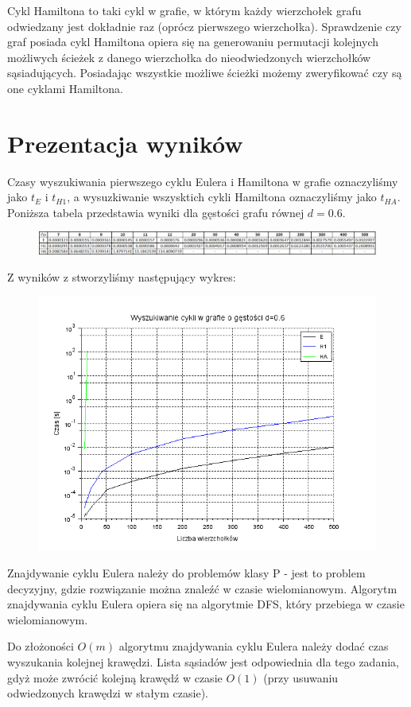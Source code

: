 \documentclass{article}
\begin{document}
Cykl Hamiltona to taki cykl w grafie, w którym każdy wierzchołek grafu odwiedzany jest dokładnie raz (oprócz pierwszego wierzchołka). Sprawdzenie czy graf posiada cykl Hamiltona opiera się na generowaniu permutacji kolejnych możliwych ścieżek z danego wierzchołka do nieodwiedzonych wierzchołków sąsiadujących. Posiadając wszystkie możliwe ścieżki możemy zweryfikować czy są one cyklami Hamiltona.

\section{Prezentacja wyników}

Czasy wyszukiwania pierwszego cyklu Eulera i Hamiltona w grafie oznaczyliśmy jako $t_E$ i $t_{H1}$, a wysuzkiwanie wszysktich cykli Hamiltona oznaczyliśmy jako $t_{HA}$. Poniższa tabela przedstawia wyniki dla gęstości grafu równej $d=0.6$.

\begin{figure}[h]
\centering
  \includegraphics[width=1.0\linewidth]{zad2_tabela.png}
\end{figure}%

Z wyników z stworzyliśmy następujący wykres:

\begin{figure}[h]
\centering
  \includegraphics[width=0.5\linewidth]{zad2_wykres.png}
\end{figure}%

Znajdywanie cyklu Eulera należy do problemów klasy P - jest to problem decyzyjny, gdzie rozwiązanie można znaleźć w czasie wielomianowym. Algorytm znajdywania cyklu Eulera opiera się na algorytmie DFS, który przebiega w czasie wielomianowym.

Do złożoności $O(m)$ algorytmu znajdywania cyklu Eulera należy dodać czas wyszukania kolejnej krawędzi. Lista sąsiadów jest odpowiednia dla tego zadania, gdyż może zwrócić kolejną krawędź w czasie $O(1)$ (przy usuwaniu odwiedzonych krawędzi w stałym czasie).
\end{document}
